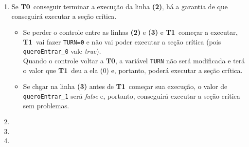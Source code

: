 \documentclass{article}
\newcommand{\Tz}{\textbf{T0}}
\newcommand{\Tu}{\textbf{T1}}
\begin{document}
\begin{enumerate}[label=\textbf{\alph*)}]
	\item Se \Tz\ conseguir terminar a execução da linha \textbf{(2)}, há a garantia de que conseguirá
		executar a seção crítica.
		\begin{itemize}
			\item Se perder o controle entre as linhas \textbf{(2)} e \textbf{(3)} e \Tu\ começar a
				executar, \Tu\ vai fazer \texttt{TURN=0} e não vai poder executar a seção crítica (pois
				\texttt{queroEntrar\_0} vale \emph{true}).\\
				Quando o controle voltar a \Tz, a variável \texttt{TURN} não será modificada e terá o valor
				que \Tu\ deu a ela (0) e, portanto, poderá executar a seção crítica.
			\item Se chgar na linha \textbf{(3)} antes de \Tu\ começar sua execução, o valor de
				\texttt{queroEntrar\_1} será \emph{false} e, portanto, conseguirá executar a seção crítica
				sem problemas.
		\end{itemize}
	\item
	\item
	\item
\end{enumerate}
\end{document}
